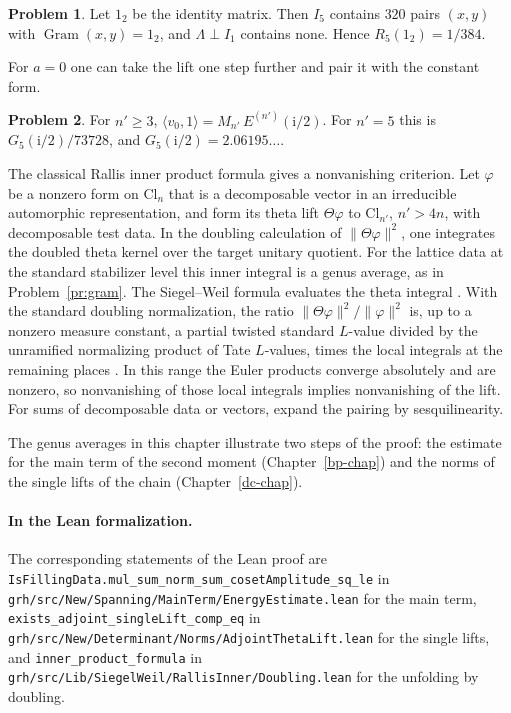 \documentclass[reqno]{amsart}
\newcounter{chap}
\theoremstyle{definition}
\newtheorem{problem}{Problem}[section]
\theoremstyle{plain}
\newcommand{\ii}{\mathrm{i}}
\newcommand{\Cl}{\mathrm{Cl}}
\newcommand{\Gram}{\operatorname{Gram}}
\begin{document}
\begin{problem}\label{pr:identity2}
Let \(1_2\) be the identity matrix.  Then \(I_5\) contains \(320\) pairs \((x,y)\) with \(\Gram(x,y) = 1_2\), and \(\Lambda \perp I_1\) contains none.  Hence \(R_5(1_2) = 1/384\).
\end{problem}

For \(a = 0\) one can take the lift one step further and pair it with the constant form.

\begin{problem}\label{pr:period}
For \(n' \ge 3\), \(\langle v_0, 1\rangle = M_{n'}\,E^{(n')}(\ii/2)\).  For \(n' = 5\) this is \(G_5(\ii/2)/73728\), and \(G_5(\ii/2) = 2.06195\ldots\).
\end{problem}

The classical Rallis inner product formula gives a nonvanishing criterion.  Let \(\varphi\) be a nonzero form on \(\Cl_n\) that is a decomposable vector in an irreducible automorphic representation, and form its theta lift \(\Theta\varphi\) to \(\Cl_{n'}\), \(n'>4n\), with decomposable test data.  In the doubling calculation of \(\lVert\Theta\varphi\rVert^2\), one integrates the doubled theta kernel over the target unitary quotient.  For the lattice data at the standard stabilizer level this inner integral is a genus average, as in Problem~\ref{pr:gram}.  The Siegel--Weil formula evaluates the theta integral \cite{Ra,JSLi}.  With the standard doubling normalization, the ratio \(\lVert\Theta\varphi\rVert^2/\lVert\varphi\rVert^2\) is, up to a nonzero measure constant, a partial twisted standard \(L\)-value divided by the unramified normalizing product of Tate \(L\)-values, times the local integrals at the remaining places \cite[\S2.4]{Li24}.  In this range the Euler products converge absolutely and are nonzero, so nonvanishing of those local integrals implies nonvanishing of the lift.  For sums of decomposable data or vectors, expand the pairing by sesquilinearity.

The genus averages in this chapter illustrate two steps of the proof: the estimate for the main term of the second moment (Chapter~\ref{bp-chap}) and the norms of the single lifts of the chain (Chapter~\ref{dc-chap}).

\paragraph{In the Lean formalization.}
The corresponding statements of the Lean proof \cite{GL} are \texttt{IsFillingData.mul\_sum\_norm\_sum\_cosetAmplitude\_sq\_le} in \texttt{grh/src/New/Spanning/MainTerm/EnergyEstimate.lean} for the main term, \texttt{exists\_adjoint\_singleLift\_comp\_eq} in \texttt{grh/src/New/Determinant/Norms/AdjointThetaLift.lean} for the single lifts, and \texttt{inner\_product\_formula} in \texttt{grh/src/Lib/SiegelWeil/RallisInner/Doubling.lean} for the unfolding by doubling.
\end{document}
